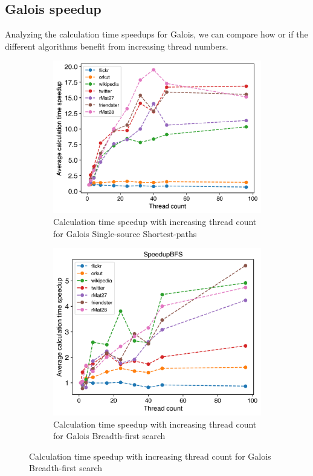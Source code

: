 



\subsection{Galois speedup}
\label{sec:galois_speedup}
Analyzing the calculation time speedups for Galois, we can compare how or if the different algorithms benefit from increasing thread numbers.


\begin{figure}
	\hfil
	\begin{subfigure}{0.32\textwidth}
		\includegraphics[width=\linewidth]{../../plots/singleNodeSSSPGaloisThreads.png}
		\caption{Calculation time speedup with increasing thread count for Galois Single-source Shortest-paths}
		\label{fig:galoisSpeedupSSSP}
	\end{subfigure}
	\hfil
	\begin{subfigure}{0.32\textwidth}
		\includegraphics[width=\linewidth]{../../plots/singleNodeBFSGaloisThreads.png}
		\caption{Calculation time speedup with increasing thread count for Galois Breadth-first search}
		\label{fig:galoisSpeedupBFS}
	\end{subfigure}
	\hfil
\end{figure}



